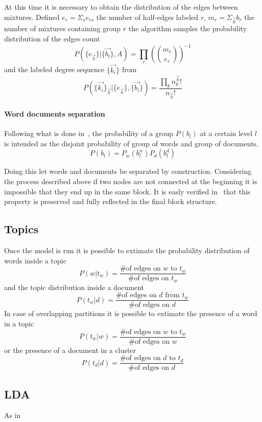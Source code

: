 At this time it is necessary to obtain the distribution of the edges between
mixtures. Defined $e_r=\Sigma_s e_{rs}$ the number of half-edges labeled $r$,
$m_r=\Sigma_{\vec{b}} b_r$ the number of mixtures containing group $r$ the
algorithm samples the probability distribution of the edges count
\[P(\{e_{\vec{b}}\}|\{\vec{b_i}\}, A)=\prod_r\left(\binom{m_r}{e_r}\right)^{-1}\] and the
labeled degree sequence $\{\vec{k_i}\}$ from
\[P(\{\vec{k_i}\}_{\vec{b}}|\{e_{\vec{b}}\}, \{\vec{b_i}\})=\frac{\prod_k n_k^{\vec{b}}!}{n_{\vec{b}}!}\]


\paragraph{Word documents separation}
Following what is done in~\cite{gerlach2018network}, the probability of a group $P(b_l)$ at a certain level $l$ is intended as the disjoint probability of
group of words and group of documents.
\begin{equation}
  P(b_l)=P_w(b_l^w)P_d(b_l^d)
\end{equation}

Doing this let words and documents be separated by construction.
Considering the process described above if two nodes are not connected at the beginning it is impossible
that they end up in the same block.
It is easly verified in~\cite{peixoto2014efficient} that this property is
preserved and fully reflected in the final block structure.

\subsection{Topics}

Once the model is run it is possible to extimate the probability distribution of words inside a topic
\[P(w|t_w)=\frac{\text{\# of edges on $w$ to $t_w$}}{\text{\# of edges on $t_w$}}\]
and the topic distribution inside a document
\[P(t_w|d)=\frac{\text{\# of edges on $d$ from $t_w$}}{\text{\# of edges on $d$}}\]
In case of overlapping partitions it is possible to extimate the presence of a
word in a topic
\[P(t_w|w)=\frac{\text{\# of edges on $w$ to $t_w$}}{\text{\# of edges on $w$}}\]
or the presence of a document in a cluster
\[P(t_d|d)=\frac{\text{\# of edges on $d$ to $t_d$}}{\text{\# of edges on $d$}}\]

\subsection{LDA}
As in ~\cite{Zhou2016}

